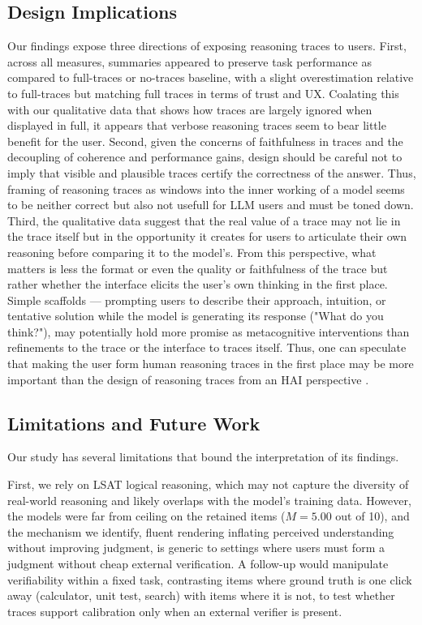 \documentclass[acmlarge,review=true, anonymous=true]{acmart}
\begin{document}
\subsection{Design Implications}
Our findings expose three directions of exposing reasoning traces to users. First, across all measures, summaries appeared to preserve task performance as compared to full-traces or no-traces baseline, with a slight overestimation relative to full-traces but matching full traces in terms of trust and UX. Coalating this with our qualitative data that shows how traces are largely ignored when displayed in full, it appears that verbose reasoning traces seem to bear little benefit for the user. 
Second, given the concerns of faithfulness in traces and the decoupling of coherence and performance gains, design should be careful not to imply that visible and plausible traces certify the correctness of the answer. Thus, framing of reasoning traces as windows into the inner working of a model seems to be neither correct \cite{} but also not usefull for LLM users and must be toned down. 
Third, the qualitative data suggest that the real value of a trace may not lie in the trace itself but in the opportunity it creates for users to articulate their own reasoning before comparing it to the model's. From this perspective, what matters is less the format or even the quality or faithfulness of the trace but rather whether the interface elicits the user's own thinking in the first place. Simple scaffolds — prompting users to describe their approach, intuition, or tentative solution while the model is generating its response ("What do you think?"), may potentially hold more promise as metacognitive interventions than refinements to the trace or the interface to traces itself. Thus, one can speculate that making the user form human reasoning traces in the first place may be more important than the design of reasoning traces from an HAI perspective \cite{FERNANDES2026108779}. 



\subsection{Limitations and Future Work}
Our study has several limitations that bound the interpretation of its findings. 

First, we rely on LSAT logical reasoning, which may not capture the diversity of real-world reasoning and likely overlaps with the model's training data. However, the models were far from ceiling on the retained items ($M = 5.00$ out of 10), and the mechanism we identify, fluent rendering inflating perceived understanding without improving judgment, is generic to settings where users must form a judgment without cheap external verification. A follow-up would manipulate verifiability within a fixed task, contrasting items where ground truth is one click away (calculator, unit test, search) with items where it is not, to test whether traces support calibration only when an external verifier is present.
\end{document}
